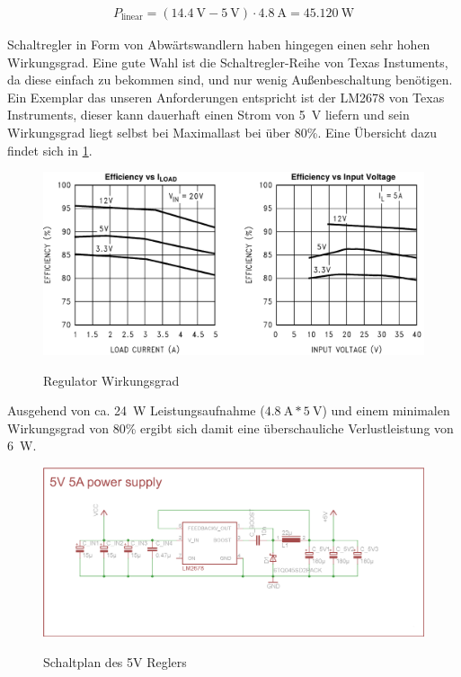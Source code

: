 \begin{align*}
P_{\text{linear}}=(\SI{14,4}{\volt}-\SI{5}{\volt})\cdot \SI{4,8}{\ampere}=\SI{45,120}{\watt}
\end{align*}

Schaltregler in Form von Abwärtswandlern haben hingegen einen sehr hohen Wirkungsgrad. Eine gute Wahl ist die Schaltregler-Reihe von Texas Instuments, da diese einfach zu bekommen sind,
und nur wenig Außenbeschaltung benötigen. Ein Exemplar das unseren Anforderungen entspricht ist der LM2678 von Texas Instruments, dieser kann dauerhaft einen Strom von \SI{5}{\volt} liefern und sein Wirkungsgrad
liegt selbst bei Maximallast bei über 80\%.
Eine Übersicht dazu findet sich in \cref{fig:vreg-eff}.
\begin{figure}[H]
\centering
\includegraphics[width=.8\textwidth]{vreg.png}\\
\caption{Regulator Wirkungsgrad \cite{ds-ti}}%
\label{fig:vreg-eff}
\end{figure}
Ausgehend von ca. \SI{24}{\watt} Leistungsaufnahme ($\SI{4,8}{\ampere}*\SI{5}{\volt}$) und einem minimalen Wirkungsgrad von 80\%  ergibt sich damit eine überschauliche Verlustleistung von \SI{6}{\watt}.


\begin{figure}[H]
\centering
\includegraphics[width=\textwidth]{5vregler.png}\\
\caption{Schaltplan des 5V Reglers}%
\label{fig:vreg}
\end{figure}


